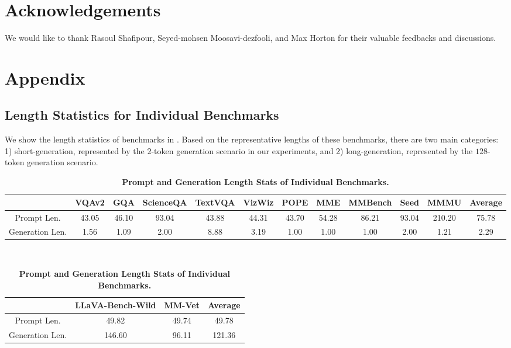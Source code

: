 \documentclass{article} %
\begin{document}
\section*{Acknowledgements}
We would like to thank Rasoul Shafipour, Seyed-mohsen Moosavi-dezfooli, and Max Horton for their valuable feedbacks and discussions. 




\newpage
\appendix
\section{Appendix}
\subsection{Length Statistics for Individual Benchmarks}
\label{subsec:bench_stats}

We show the length statistics of benchmarks in . Based on the representative lengths of these benchmarks, there are two main categories: 1) short-generation, represented by the $2$-token generation scenario in our experiments, and 2) long-generation, represented by the $128$-token generation scenario.

\begin{table}[H]
\tiny
\centering
\caption{\textbf{Prompt and Generation Length Stats of Individual Benchmarks.}}
\label{tab:bench_stats}
\begin{tabular}{c|cccccccccc|c}
\toprule
              & VQAv2 & GQA   & ScienceQA & TextVQA & VizWiz & POPE  & MME   & MMBench & Seed  & MMMU   & Average \\
\midrule
Prompt Len. & 43.05 & 46.10 & 93.04     & 43.88   & 44.31  & 43.70 & 54.28 & 86.21   & 93.04 & 210.20 & 75.78   \\
Generation Len. & 1.56  & 1.09  & 2.00      & 8.88    & 3.19   & 1.00  & 1.00  & 1.00    & 2.00  & 1.21   & 2.29  \\
\bottomrule
\end{tabular}
 \\
\begin{tabular}{c|cc|c}
\toprule
              & LLaVA-Bench-Wild & MM-Vet & Average \\
\midrule
Prompt Len. & 49.82            & 49.74  & 49.78   \\
Generation Len. & 146.60           & 96.11  & 121.36 \\
\bottomrule
\end{tabular}
\end{table}
\end{document}
